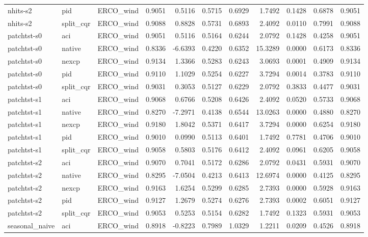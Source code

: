 \begin{tabular}{lllrrrrrrrr}
nhits-s2 & pid & ERCO_wind & 0.9051 & 0.5116 & 0.5715 & 0.6929 & 1.7492 & 0.1428 & 0.6878 & 0.9051 \\
nhits-s2 & split_cqr & ERCO_wind & 0.9088 & 0.8828 & 0.5731 & 0.6893 & 2.4092 & 0.0110 & 0.7991 & 0.9088 \\
patchtst-s0 & aci & ERCO_wind & 0.9051 & 0.5116 & 0.5164 & 0.6244 & 2.0792 & 0.1428 & 0.4258 & 0.9051 \\
patchtst-s0 & native & ERCO_wind & 0.8336 & -6.6393 & 0.4220 & 0.6352 & 15.3289 & 0.0000 & 0.6173 & 0.8336 \\
patchtst-s0 & nexcp & ERCO_wind & 0.9134 & 1.3366 & 0.5283 & 0.6243 & 3.0693 & 0.0001 & 0.4909 & 0.9134 \\
patchtst-s0 & pid & ERCO_wind & 0.9110 & 1.1029 & 0.5254 & 0.6227 & 3.7294 & 0.0014 & 0.3783 & 0.9110 \\
patchtst-s0 & split_cqr & ERCO_wind & 0.9031 & 0.3053 & 0.5127 & 0.6229 & 2.0792 & 0.3833 & 0.4477 & 0.9031 \\
patchtst-s1 & aci & ERCO_wind & 0.9068 & 0.6766 & 0.5208 & 0.6426 & 2.4092 & 0.0520 & 0.5733 & 0.9068 \\
patchtst-s1 & native & ERCO_wind & 0.8270 & -7.2971 & 0.4138 & 0.6544 & 13.0263 & 0.0000 & 0.4880 & 0.8270 \\
patchtst-s1 & nexcp & ERCO_wind & 0.9180 & 1.8042 & 0.5371 & 0.6417 & 3.7294 & 0.0000 & 0.6254 & 0.9180 \\
patchtst-s1 & pid & ERCO_wind & 0.9010 & 0.0990 & 0.5113 & 0.6401 & 1.7492 & 0.7781 & 0.4706 & 0.9010 \\
patchtst-s1 & split_cqr & ERCO_wind & 0.9058 & 0.5803 & 0.5176 & 0.6412 & 2.4092 & 0.0961 & 0.6205 & 0.9058 \\
patchtst-s2 & aci & ERCO_wind & 0.9070 & 0.7041 & 0.5172 & 0.6286 & 2.0792 & 0.0431 & 0.5931 & 0.9070 \\
patchtst-s2 & native & ERCO_wind & 0.8295 & -7.0504 & 0.4213 & 0.6413 & 12.6974 & 0.0000 & 0.4125 & 0.8295 \\
patchtst-s2 & nexcp & ERCO_wind & 0.9163 & 1.6254 & 0.5299 & 0.6285 & 2.7393 & 0.0000 & 0.5928 & 0.9163 \\
patchtst-s2 & pid & ERCO_wind & 0.9127 & 1.2679 & 0.5274 & 0.6276 & 2.7393 & 0.0002 & 0.6051 & 0.9127 \\
patchtst-s2 & split_cqr & ERCO_wind & 0.9053 & 0.5253 & 0.5154 & 0.6282 & 1.7492 & 0.1323 & 0.5931 & 0.9053 \\
seasonal_naive & aci & ERCO_wind & 0.8918 & -0.8223 & 0.7989 & 1.0329 & 1.2211 & 0.0209 & 0.4526 & 0.8918 \\

\end{tabular}

